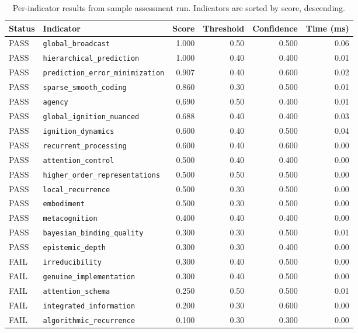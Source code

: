 \begin{table}[ht]
\centering
\small
\begin{tabular}{@{}llrrrr@{}}
\toprule
\textbf{Status} & \textbf{Indicator} & \textbf{Score} & \textbf{Threshold} & \textbf{Confidence} & \textbf{Time (ms)} \\
\midrule
PASS & \texttt{global\_broadcast}              & 1.000 & 0.50 & 0.500 & 0.06 \\
PASS & \texttt{hierarchical\_prediction}       & 1.000 & 0.40 & 0.400 & 0.01 \\
PASS & \texttt{prediction\_error\_minimization} & 0.907 & 0.40 & 0.600 & 0.02 \\
PASS & \texttt{sparse\_smooth\_coding}         & 0.860 & 0.30 & 0.500 & 0.01 \\
PASS & \texttt{agency}                         & 0.690 & 0.50 & 0.400 & 0.01 \\
PASS & \texttt{global\_ignition\_nuanced}      & 0.688 & 0.40 & 0.400 & 0.03 \\
PASS & \texttt{ignition\_dynamics}             & 0.600 & 0.40 & 0.500 & 0.04 \\
PASS & \texttt{recurrent\_processing}          & 0.600 & 0.40 & 0.600 & 0.00 \\
PASS & \texttt{attention\_control}             & 0.500 & 0.40 & 0.400 & 0.00 \\
PASS & \texttt{higher\_order\_representations} & 0.500 & 0.50 & 0.500 & 0.00 \\
PASS & \texttt{local\_recurrence}              & 0.500 & 0.30 & 0.500 & 0.00 \\
PASS & \texttt{embodiment}                     & 0.500 & 0.30 & 0.500 & 0.00 \\
PASS & \texttt{metacognition}                  & 0.400 & 0.40 & 0.400 & 0.00 \\
PASS & \texttt{bayesian\_binding\_quality}     & 0.300 & 0.30 & 0.500 & 0.01 \\
PASS & \texttt{epistemic\_depth}               & 0.300 & 0.30 & 0.400 & 0.00 \\
\midrule
FAIL & \texttt{irreducibility}                 & 0.300 & 0.40 & 0.500 & 0.00 \\
FAIL & \texttt{genuine\_implementation}        & 0.300 & 0.40 & 0.500 & 0.00 \\
FAIL & \texttt{attention\_schema}              & 0.250 & 0.50 & 0.500 & 0.01 \\
FAIL & \texttt{integrated\_information}        & 0.200 & 0.30 & 0.600 & 0.00 \\
FAIL & \texttt{algorithmic\_recurrence}        & 0.100 & 0.30 & 0.300 & 0.00 \\
\bottomrule
\end{tabular}
\caption{Per-indicator results from sample assessment run. Indicators are sorted by score, descending.}
\label{tab:sample-indicators}
\end{table}

